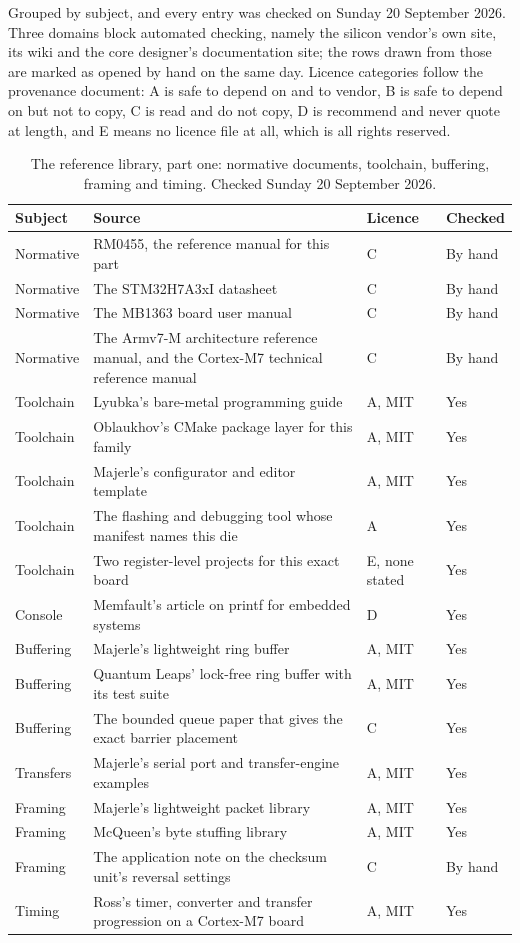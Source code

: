 Grouped by subject, and every entry was checked on Sunday 20 September 2026.
Three domains block automated checking, namely the silicon vendor's own site,
its wiki and the core designer's documentation site; the rows drawn from those
are marked as opened by hand on the same day. Licence categories follow the
provenance document: A is safe to depend on and to vendor, B is safe to depend
on but not to copy, C is read and do not copy, D is recommend and never quote at
length, and E means no licence file at all, which is all rights reserved.

\begin{table}[H]\centering\small
\begin{tabular}{p{28mm}p{80mm}p{22mm}p{18mm}}
\toprule
Subject & Source & Licence & Checked \\
\midrule
Normative & RM0455, the reference manual for this part & C & By hand \\
Normative & The STM32H7A3xI datasheet & C & By hand \\
Normative & The MB1363 board user manual & C & By hand \\
Normative & The Armv7-M architecture reference manual, and the Cortex-M7 technical reference manual & C & By hand \\
Toolchain & Lyubka's bare-metal programming guide & A, MIT & Yes \\
Toolchain & Oblaukhov's CMake package layer for this family & A, MIT & Yes \\
Toolchain & Majerle's configurator and editor template & A, MIT & Yes \\
Toolchain & The flashing and debugging tool whose manifest names this die & A & Yes \\
Toolchain & Two register-level projects for this exact board & E, none stated & Yes \\
Console & Memfault's article on printf for embedded systems & D & Yes \\
Buffering & Majerle's lightweight ring buffer & A, MIT & Yes \\
Buffering & Quantum Leaps' lock-free ring buffer with its test suite & A, MIT & Yes \\
Buffering & The bounded queue paper that gives the exact barrier placement & C & Yes \\
Transfers & Majerle's serial port and transfer-engine examples & A, MIT & Yes \\
Framing & Majerle's lightweight packet library & A, MIT & Yes \\
Framing & McQueen's byte stuffing library & A, MIT & Yes \\
Framing & The application note on the checksum unit's reversal settings & C & By hand \\
Timing & Ross's timer, converter and transfer progression on a Cortex-M7 board & A, MIT & Yes \\
\bottomrule
\end{tabular}
\caption{The reference library, part one: normative documents, toolchain, buffering, framing and timing. Checked Sunday 20 September 2026.}
\end{table}

